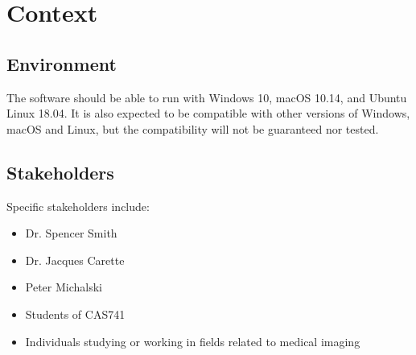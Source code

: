 \documentclass{article}
\begin{document}
\section*{Context}
 \subsection*{Environment}
The software should be able to run with Windows 10, macOS 10.14, and Ubuntu Linux 18.04. It is also expected to be compatible with other versions of Windows, macOS and Linux, but the compatibility will not be guaranteed nor tested.

 \subsection*{Stakeholders}
Specific stakeholders include:
\begin{itemize}
\item Dr. Spencer Smith
\item Dr. Jacques Carette
\item Peter Michalski
\item Students of CAS741 
\item Individuals studying or working in fields related to medical imaging
\end{itemize}
\end{document}
